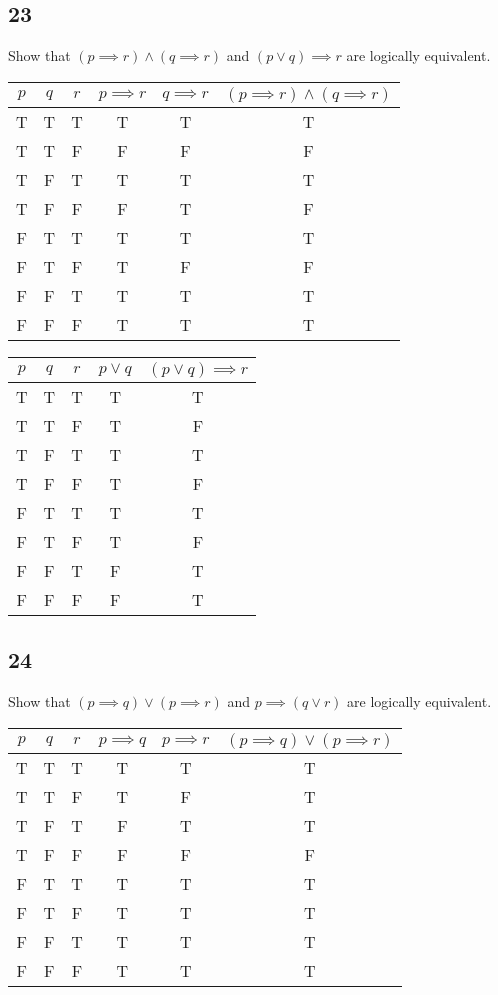 \documentclass{article}
\begin{document}
\subsection{23}

Show that $ ( p \implies r ) \land ( q \implies r ) $ and $ ( p \lor q ) \implies r $ are logically equivalent.

\begin{tabular}{ | c | c | c | c | c | c | }
	$ p $ & $ q $ & $ r $ & $ p \implies r $ & $ q \implies r $ & $ ( p \implies r ) \land ( q \implies r ) $ \\
	\hline
	T & T & T & T & T & T \\
	T & T & F & F & F & F \\
	T & F & T & T & T & T \\
	T & F & F & F & T & F \\
	F & T & T & T & T & T \\
	F & T & F & T & F & F \\
	F & F & T & T & T & T \\
	F & F & F & T & T & T \\
\end{tabular}

\begin{tabular}{ | c | c | c | c | c | }
	$ p $ & $ q $ & $ r $ & $ p \lor q $ & $ ( p \lor q ) \implies r $ \\
	\hline
	T & T & T & T & T \\
	T & T & F & T & F \\
	T & F & T & T & T \\
	T & F & F & T & F \\
	F & T & T & T & T \\
	F & T & F & T & F \\
	F & F & T & F & T \\
	F & F & F & F & T \\
\end{tabular}

\subsection{24}

Show that $ ( p \implies q ) \lor ( p \implies r ) $ and $ p \implies ( q \lor r ) $ are logically equivalent.

\begin{tabular}{ | c | c | c | c | c | c | }
	$ p $ & $ q $ & $ r $ & $ p \implies q $ & $ p \implies r $ & $ ( p \implies q ) \lor ( p \implies r ) $ \\
	\hline
	T & T & T & T & T & T \\
	T & T & F & T & F & T \\
	T & F & T & F & T & T \\
	T & F & F & F & F & F \\
	F & T & T & T & T & T \\
	F & T & F & T & T & T \\
	F & F & T & T & T & T \\
	F & F & F & T & T & T \\
\end{tabular}
\end{document}
